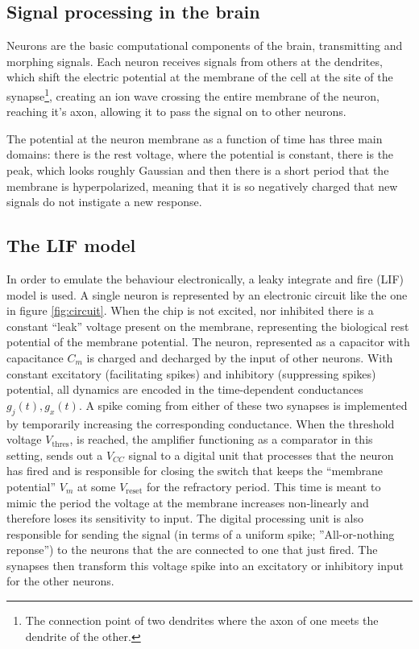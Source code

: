 \documentclass[a4paper,twocolumn]{article}
\begin{document}
\subsection{Signal processing in the brain}
Neurons are the basic computational components of the
brain, transmitting and morphing signals. Each neuron receives signals from
others at the dendrites, which shift the electric potential at the membrane of
the cell at the site of the synapse\footnote{The connection point of two
dendrites where the axon of one meets the dendrite of the other.}, creating an
ion wave crossing the entire membrane of the neuron, reaching it's axon,
allowing it to pass the signal on to other neurons.

The potential at the neuron membrane as a function of time has three main
domains: there is the rest voltage, where the potential is constant, there is
the peak, which looks roughly Gaussian and then there is a short period that the
membrane is hyperpolarized, meaning that it is so negatively charged that new
signals do not instigate a new response.


\subsection{The LIF model}
In order to emulate the behaviour electronically, a leaky integrate and fire
(LIF) model is used. A single neuron is represented by an electronic circuit
like the one in figure \ref{fig:circuit}. When the chip is not excited, nor
inhibited there is a constant ``leak'' voltage present on the membrane,
representing the biological rest potential of the membrane potential.  The neuron,
represented as a capacitor with capacitance $C_m$ is charged and decharged
by the input of other neurons. With constant excitatory (facilitating spikes) and
inhibitory (suppressing spikes) potential,  all dynamics are encoded in the
time-dependent conductances $g_j(t),  g_x(t)$.  A spike coming from either
of these two synapses is implemented by temporarily increasing the corresponding
conductance.  When the threshold voltage $V_\text{thres}$,  is reached,
the amplifier functioning as a comparator in this setting,  sends out a
$V_{CC}$ signal to a digital unit that processes that the neuron has fired
and is responsible for closing the switch that keeps the
``membrane potential'' $V_m$ at some $V_\text{reset}$ for the refractory
period. This time is meant to mimic the period the voltage at the membrane
increases non-linearly and therefore loses its sensitivity to input. The digital
processing unit is also responsible for sending the signal (in terms of a
uniform spike; ''All-or-nothing reponse'') to the neurons that the are
connected to one that just fired.  The synapses then transform this voltage
spike into an excitatory or inhibitory input for the other neurons.
\end{document}
